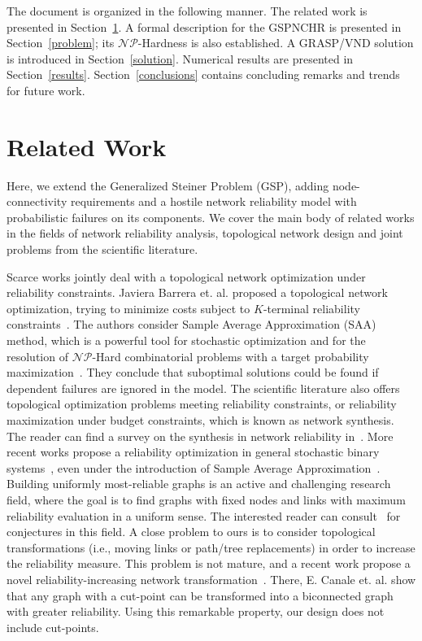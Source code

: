 \documentclass{llncs}
\begin{document}
The document is organized in the following manner. The related work is presented in Section~\ref{work}. 
A formal description for the GSPNCHR is presented in Section~\ref{problem}; its $\mathcal{NP}$-Hardness is also established. 
A GRASP/VND solution is introduced in Section~\ref{solution}. 
Numerical results are presented in Section~\ref{results}. 
Section~\ref{conclusions} contains concluding remarks and trends for future work. 


\section{Related Work} \label{work}
Here, we extend the Generalized Steiner Problem (GSP), adding node-connectivity requirements and a hostile network reliability model with probabilistic failures on its components. We cover the main body of related works in the 
fields of network reliability analysis, topological network design and joint problems from the scientific literature. 

Scarce works jointly deal with a topological network optimization under reliability constraints. Javiera Barrera et. al. proposed a topological network optimization, trying to minimize costs subject to $K$-terminal reliability constraints~\cite{106}. The authors consider Sample Average Approximation (SAA) method, which is a powerful tool for  stochastic optimization and for the resolution of $\mathcal{NP}$-Hard combinatorial problems with a target probability maximization~\cite{112}. They conclude that suboptimal solutions could be found if dependent failures are ignored in the model. The scientific literature also offers topological optimization problems meeting reliability constraints, or reliability maximization under budget constraints, which is known as network synthesis. 
The reader can find a survey on the synthesis in network reliability in~\cite{113}. 
More recent works propose a reliability optimization in general stochastic binary systems~\cite{107}, even under the introduction of Sample Average Approximation~\cite{114}. Building uniformly most-reliable graphs is an active and challenging research field, where the goal is to find graphs with fixed nodes and links with maximum reliability evaluation in a uniform sense. 
The interested reader can consult~\cite{115} for conjectures in this field. A close problem to ours is to consider topological transformations (i.e., moving links or path/tree replacements) in order to increase the reliability measure. This problem is not mature, and a recent work propose a novel reliability-increasing network transformation~\cite{110}. There, E. Canale et. al. show that any graph with a cut-point can be transformed into a biconnected graph with greater reliability. Using this remarkable property, our design does not include cut-points. 
\end{document}
